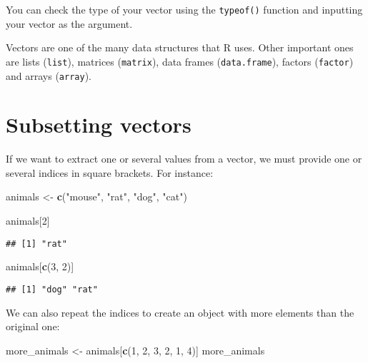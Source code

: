 \documentclass[]{book}
\newenvironment{Shaded}{\begin{snugshade}}{\end{snugshade}}
\newcommand{\DecValTok}[1]{\textcolor[rgb]{0.00,0.00,0.81}{#1}}
\newcommand{\KeywordTok}[1]{\textcolor[rgb]{0.13,0.29,0.53}{\textbf{#1}}}
\newcommand{\NormalTok}[1]{#1}
\newcommand{\StringTok}[1]{\textcolor[rgb]{0.31,0.60,0.02}{#1}}
\begin{document}
You can check the type of your vector using the \texttt{typeof()} function and inputting your vector as the argument.

Vectors are one of the many data structures that R uses. Other important ones are lists (\texttt{list}), matrices (\texttt{matrix}), data frames (\texttt{data.frame}), factors (\texttt{factor}) and arrays (\texttt{array}).

\hypertarget{subsetting-vectors}{%
\section{Subsetting vectors}\label{subsetting-vectors}}

If we want to extract one or several values from a vector, we must provide one or several indices in square brackets. For instance:

\begin{Shaded}
\begin{Highlighting}[]
\NormalTok{animals <-}\StringTok{ }\KeywordTok{c}\NormalTok{(}\StringTok{"mouse"}\NormalTok{, }\StringTok{"rat"}\NormalTok{, }\StringTok{"dog"}\NormalTok{, }\StringTok{"cat"}\NormalTok{)}
\end{Highlighting}
\end{Shaded}

\begin{Shaded}
\begin{Highlighting}[]
\NormalTok{animals[}\DecValTok{2}\NormalTok{]}
\end{Highlighting}
\end{Shaded}

\begin{verbatim}
## [1] "rat"
\end{verbatim}

\begin{Shaded}
\begin{Highlighting}[]
\NormalTok{animals[}\KeywordTok{c}\NormalTok{(}\DecValTok{3}\NormalTok{, }\DecValTok{2}\NormalTok{)]}
\end{Highlighting}
\end{Shaded}

\begin{verbatim}
## [1] "dog" "rat"
\end{verbatim}

We can also repeat the indices to create an object with more elements than the original one:

\begin{Shaded}
\begin{Highlighting}[]
\NormalTok{more_animals <-}\StringTok{ }\NormalTok{animals[}\KeywordTok{c}\NormalTok{(}\DecValTok{1}\NormalTok{, }\DecValTok{2}\NormalTok{, }\DecValTok{3}\NormalTok{, }\DecValTok{2}\NormalTok{, }\DecValTok{1}\NormalTok{, }\DecValTok{4}\NormalTok{)]}
\NormalTok{more_animals}
\end{Highlighting}
\end{Shaded}
\end{document}
